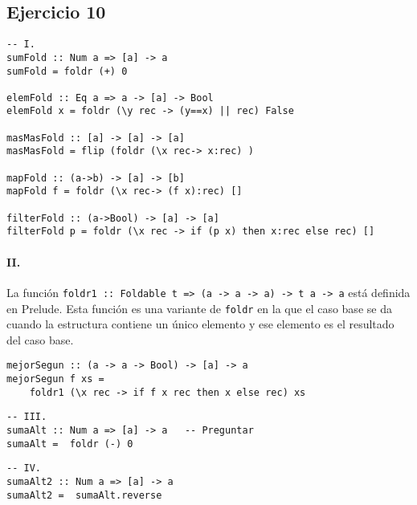 \documentclass[10pt,a4paper]{article}
\begin{document}
\subsection{Ejercicio 10}
\begin{centrado}
	\begin{verbatim}
-- I.
sumFold :: Num a => [a] -> a
sumFold = foldr (+) 0

elemFold :: Eq a => a -> [a] -> Bool
elemFold x = foldr (\y rec -> (y==x) || rec) False

masMasFold :: [a] -> [a] -> [a]
masMasFold = flip (foldr (\x rec-> x:rec) )

mapFold :: (a->b) -> [a] -> [b]
mapFold f = foldr (\x rec-> (f x):rec) []

filterFold :: (a->Bool) -> [a] -> [a]
filterFold p = foldr (\x rec -> if (p x) then x:rec else rec) []
	\end{verbatim}
\end{centrado}

\paragraph{II.} La función \texttt{foldr1 :: Foldable t => (a -> a -> a) -> t a -> a} está definida en Prelude. Esta función es una variante de \texttt{foldr} en la que el caso base se da cuando la estructura contiene un único elemento y ese elemento es el resultado del caso base.

\begin{centrado}
	\begin{verbatim}
mejorSegun :: (a -> a -> Bool) -> [a] -> a
mejorSegun f xs = 
	foldr1 (\x rec -> if f x rec then x else rec) xs
	\end{verbatim}
\end{centrado}

\begin{centrado}
	\begin{verbatim}
-- III.
sumaAlt :: Num a => [a] -> a   -- Preguntar
sumaAlt =  foldr (-) 0
	\end{verbatim}
\end{centrado}

\begin{centrado}
	\begin{verbatim}
-- IV.
sumaAlt2 :: Num a => [a] -> a
sumaAlt2 =  sumaAlt.reverse
	\end{verbatim}
\end{centrado}
\end{document}
